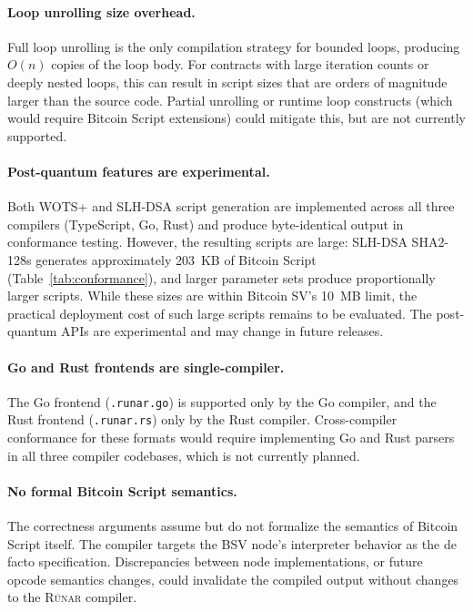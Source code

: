 \documentclass[11pt,a4paper]{article}
\newcommand{\runar}{\textsc{Rúnar}}
\begin{document}
\paragraph{Loop unrolling size overhead.}
Full loop unrolling is the only compilation strategy for bounded loops,
producing $O(n)$ copies of the loop body. For contracts with large
iteration counts or deeply nested loops, this can result in script sizes
that are orders of magnitude larger than the source code. Partial
unrolling or runtime loop constructs (which would require Bitcoin Script
extensions) could mitigate this, but are not currently supported.

\paragraph{Post-quantum features are experimental.}
Both WOTS+ and SLH-DSA script generation are implemented across all three
compilers (TypeScript, Go, Rust) and produce byte-identical output in
conformance testing. However, the resulting scripts are large:
SLH-DSA SHA2-128s generates approximately 203~KB of Bitcoin Script
(Table~\ref{tab:conformance}), and larger parameter sets produce
proportionally larger scripts. While these sizes are within Bitcoin SV's
10~MB limit, the practical deployment cost of such large scripts remains
to be evaluated. The post-quantum APIs are experimental and may change in
future releases.

\paragraph{Go and Rust frontends are single-compiler.}
The Go frontend (\texttt{.runar.go}) is supported only by the Go compiler,
and the Rust frontend (\texttt{.runar.rs}) only by the Rust compiler.
Cross-compiler conformance for these formats would require implementing
Go and Rust parsers in all three compiler codebases, which is not
currently planned.

\paragraph{No formal Bitcoin Script semantics.}
The correctness arguments assume but do not formalize the semantics of
Bitcoin Script itself. The compiler targets the BSV node's interpreter
behavior as the de facto specification. Discrepancies between node
implementations, or future opcode semantics changes, could invalidate
the compiled output without changes to the \runar{} compiler.
\end{document}
